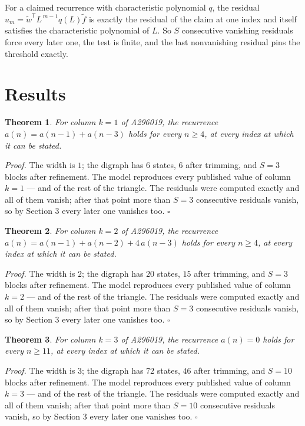 \documentclass[11pt]{article}
\newtheorem{theorem}{Theorem}
\theoremstyle{definition}
\begin{document}
For a claimed recurrence with characteristic polynomial $q$, the residual $u_m = \tilde w^{\mathsf T}L^{\,m-1}q(L)\tilde f$ is exactly the residual of the claim at one index and itself satisfies the characteristic polynomial of $L$. So $S$ consecutive vanishing residuals force every later one, the test is finite, and the last nonvanishing residual pins the threshold exactly.

\section{Results}

\begin{theorem} For column $k = 1$ of A296019, the recurrence $a(n) = a(n-1) + a(n-3)$ holds for every $n \ge 4$, at every index at which it can be stated.\end{theorem}

{\itshape Proof.} The width is $1$; the digraph has $6$ states, $6$ after trimming, and $S = 3$ blocks after refinement. The model reproduces every published value of column $k = 1$ --- and of the rest of the triangle. The residuals were computed exactly and all of them vanish; after that point more than $S = 3$ consecutive residuals vanish, so by Section 3 every later one vanishes too. $\square$

\begin{theorem} For column $k = 2$ of A296019, the recurrence $a(n) = a(n-1) + a(n-2) + 4\,a(n-3)$ holds for every $n \ge 4$, at every index at which it can be stated.\end{theorem}

{\itshape Proof.} The width is $2$; the digraph has $20$ states, $15$ after trimming, and $S = 3$ blocks after refinement. The model reproduces every published value of column $k = 2$ --- and of the rest of the triangle. The residuals were computed exactly and all of them vanish; after that point more than $S = 3$ consecutive residuals vanish, so by Section 3 every later one vanishes too. $\square$

\begin{theorem} For column $k = 3$ of A296019, the recurrence $a(n) = 0$ holds for every $n \ge 11$, at every index at which it can be stated.\end{theorem}

{\itshape Proof.} The width is $3$; the digraph has $72$ states, $46$ after trimming, and $S = 10$ blocks after refinement. The model reproduces every published value of column $k = 3$ --- and of the rest of the triangle. The residuals were computed exactly and all of them vanish; after that point more than $S = 10$ consecutive residuals vanish, so by Section 3 every later one vanishes too. $\square$
\end{document}
